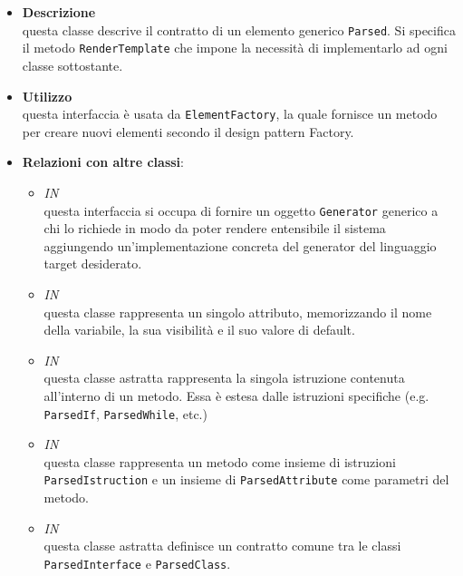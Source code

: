 \label{\nogloxy{swedesigner::server::project::ParsedElement}}
\begin{itemize}
\item \textbf{Descrizione}\\
questa classe descrive il contratto di un elemento generico \texttt{Parsed}. Si specifica il metodo \texttt{RenderTemplate} che impone la necessità di implementarlo ad ogni classe sottostante.
\item \textbf{Utilizzo}\\
questa interfaccia è usata da \texttt{ElementFactory}, la quale fornisce un metodo per creare nuovi elementi secondo il design pattern Factory. %
\item \textbf{Relazioni con altre classi}:
\begin{itemize}
\item \textit{IN} \hyperref[\nogloxy{swedesigner::server::generator::Generator}]{}\\
questa interfaccia si occupa di fornire un oggetto \texttt{Generator} generico a chi lo richiede in modo da poter rendere entensibile il sistema aggiungendo un'implementazione concreta del generator del linguaggio target desiderato.
\item \textit{IN} \hyperref[\nogloxy{swedesigner::server::project::ParsedAttribute}]{}\\
questa classe rappresenta un singolo attributo, memorizzando il nome della variabile, la sua visibilità e il suo valore di default. 
\item \textit{IN} \hyperref[\nogloxy{swedesigner::server::project::ParsedInstruction}]{}\\
questa classe astratta rappresenta la singola istruzione contenuta all'interno di un metodo. Essa è estesa dalle istruzioni specifiche (e.g. \texttt{ParsedIf}, \texttt{ParsedWhile}, etc.)
\item \textit{IN} \hyperref[\nogloxy{swedesigner::server::project::ParsedMethod}]{}\\
questa classe rappresenta un metodo come insieme di istruzioni \texttt{ParsedIstruction} e un insieme di \texttt{ParsedAttribute} come parametri del metodo.
\item \textit{IN} \hyperref[\nogloxy{swedesigner::server::project::ParsedType}]{}\\
questa classe astratta definisce un contratto comune tra le classi \texttt{ParsedInterface} e \texttt{ParsedClass}. 
\end{itemize}
\end{itemize}

